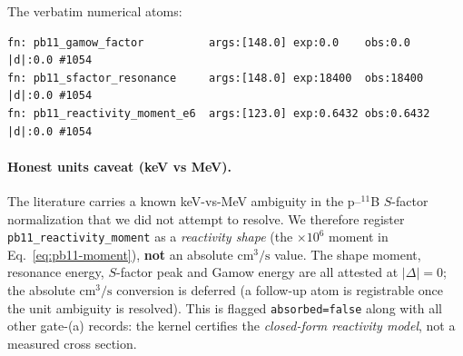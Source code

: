 The verbatim numerical atoms:
\begin{lstlisting}
fn: pb11_gamow_factor          args:[148.0] exp:0.0    obs:0.0    |d|:0.0 #1054
fn: pb11_sfactor_resonance     args:[148.0] exp:18400  obs:18400  |d|:0.0 #1054
fn: pb11_reactivity_moment_e6  args:[123.0] exp:0.6432 obs:0.6432 |d|:0.0 #1054
\end{lstlisting}

\paragraph{Honest units caveat (keV vs MeV).}
The literature carries a known keV-vs-MeV ambiguity in the p--$^{11}$B
$S$-factor normalization that we did not attempt to resolve. We therefore
register \verb|pb11_reactivity_moment| as a \emph{reactivity shape} (the
$\times10^6$ moment in Eq.~\ref{eq:pb11-moment}), \textbf{not} an absolute
$\text{cm}^3/\text{s}$ value. The shape moment, resonance energy, $S$-factor
peak and Gamow energy are all attested at $|\Delta|=0$; the absolute
$\text{cm}^3/\text{s}$ conversion is deferred (a follow-up atom is
registrable once the unit ambiguity is resolved). This is flagged
\texttt{absorbed=false} along with all other gate-(a) records: the kernel
certifies the \emph{closed-form reactivity model}, not a measured cross
section.
